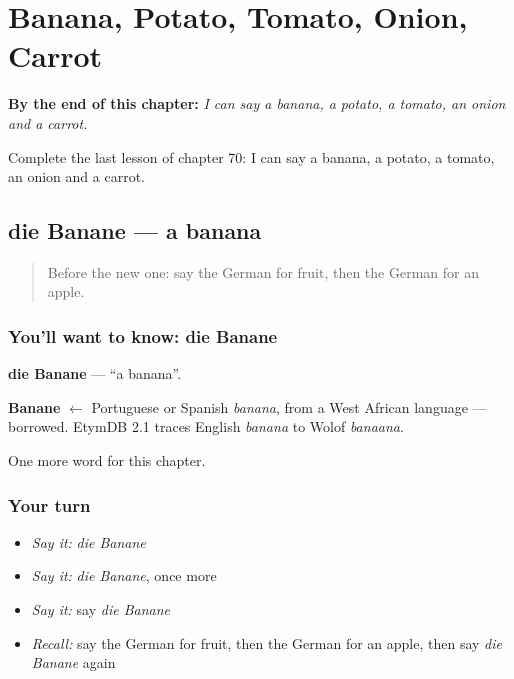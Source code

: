 
\chapter{Banana, Potato, Tomato, Onion, Carrot}
\label{ch:ge-banana-potato-tomato-onion-carrot}

\begin{chapteropening}
\textbf{By the end of this chapter:} \emph{I can say a banana, a potato, a tomato, an onion and a carrot.}

Complete the last lesson of chapter 70: I can say a banana, a potato, a tomato, an onion and a carrot.
\end{chapteropening}

\section[die Banane]{die Banane — a banana}

\label{lesson:GE-C70-banane}



\begin{quote}
Before the new one: say the German for fruit, then the German for an apple.
\end{quote}

\subsection*{You'll want to know: die Banane}
\textbf{die Banane} — \textquotedblleft{}a banana\textquotedblright{}.

\begin{cousinweb}
\textbf{Banane} $\leftarrow$ Portuguese or Spanish \emph{banana}, from a West African language — borrowed. EtymDB 2.1 traces English \emph{banana} to Wolof \emph{banaana}.
\end{cousinweb}

\begin{grammarlens}[title={What you've built}]
One more word for this chapter.
\end{grammarlens}

\subsection*{Your turn}
\begin{itemize}
\raggedright
  \item \emph{Say it:} \emph{die Banane}
  \item \emph{Say it:} \emph{die Banane}, once more
  \item \emph{Say it:} say \emph{die Banane}
  \item \emph{Recall:} say the German for fruit, then the German for an apple, then say \emph{die Banane} again
\end{itemize}

